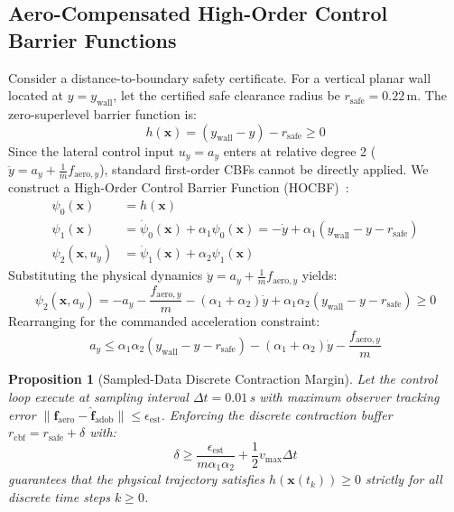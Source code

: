 \documentclass[11pt,a4paper]{article}
\newtheorem{proposition}[theorem]{Proposition}
\begin{document}
\subsection{Aero-Compensated High-Order Control Barrier Functions}
Consider a distance-to-boundary safety certificate. For a vertical planar wall located at $y = y_{\text{wall}}$, let the certified safe clearance radius be $r_{\text{safe}} = 0.22\,$m. The zero-superlevel barrier function is:
\begin{equation}
h(\mathbf{x}) = (y_{\text{wall}} - y) - r_{\text{safe}} \ge 0
\label{eq:barrier_func}
\end{equation}
Since the lateral control input $u_y = a_y$ enters at relative degree 2 ($\ddot{y} = a_y + \frac{1}{m} f_{\text{aero}, y}$), standard first-order CBFs cannot be directly applied. We construct a High-Order Control Barrier Function (HOCBF)~\cite{xiao2019control}:
\begin{align}
\psi_0(\mathbf{x}) &= h(\mathbf{x}) \\
\psi_1(\mathbf{x}) &= \dot{\psi}_0(\mathbf{x}) + \alpha_1 \psi_0(\mathbf{x}) = -\dot{y} + \alpha_1 (y_{\text{wall}} - y - r_{\text{safe}}) \\
\psi_2(\mathbf{x}, u_y) &= \dot{\psi}_1(\mathbf{x}) + \alpha_2 \psi_1(\mathbf{x})
\end{align}
Substituting the physical dynamics $\ddot{y} = a_y + \frac{1}{m} f_{\text{aero}, y}$ yields:
\begin{equation}
\psi_2(\mathbf{x}, a_y) = -a_y - \frac{f_{\text{aero}, y}}{m} - (\alpha_1 + \alpha_2) \dot{y} + \alpha_1 \alpha_2 (y_{\text{wall}} - y - r_{\text{safe}}) \ge 0
\end{equation}
Rearranging for the commanded acceleration constraint:
\begin{equation}
a_y \le \alpha_1 \alpha_2 (y_{\text{wall}} - y - r_{\text{safe}}) - (\alpha_1 + \alpha_2) \dot{y} - \frac{f_{\text{aero}, y}}{m}
\label{eq:hocbf_constraint}
\end{equation}

\begin{proposition}[Sampled-Data Discrete Contraction Margin]
Let the control loop execute at sampling interval $\Delta t = 0.01\,$s with maximum observer tracking error $\|\mathbf{f}_{\text{aero}} - \hat{\mathbf{f}}_{\text{adob}}\| \le \epsilon_{\text{est}}$. Enforcing the discrete contraction buffer $r_{\text{cbf}} = r_{\text{safe}} + \delta$ with:
\begin{equation}
\delta \ge \frac{\epsilon_{\text{est}}}{m \alpha_1 \alpha_2} + \frac{1}{2} v_{\max} \Delta t
\end{equation}
guarantees that the physical trajectory satisfies $h(\mathbf{x}(t_k)) \ge 0$ strictly for all discrete time steps $k \ge 0$.
\end{proposition}
\end{document}
